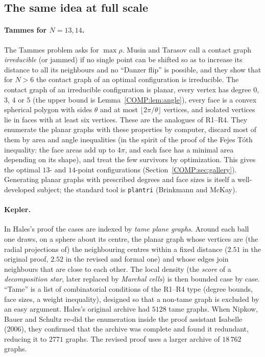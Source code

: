\documentclass[11pt,openany]{book}
\theoremstyle{plain}
\theoremstyle{definition}
\theoremstyle{remark}
\begin{document}
\subsection{The same idea at full scale}
\paragraph{Tammes for $N=13,14$.} The Tammes problem asks for $\max\rho$. Musin and Tarasov call a
contact graph \emph{irreducible} (or jammed) if no single point can be shifted so as to increase its
distance to all its neighbours and no ``Danzer flip'' is possible, and they show that for $N>6$ the
contact graph of an optimal configuration is irreducible. The
contact graph of an irreducible configuration is planar, every vertex has degree $0$, $3$, $4$ or $5$
(the upper bound is Lemma~\ref{COMP:lem:angle}), every face is a convex spherical polygon with sides $\theta$ and at most
$\lfloor2\pi/\theta\rfloor$ vertices, and isolated vertices lie in faces with at least six vertices.
These are the analogues of R1--R4. They enumerate the planar graphs with these properties by computer,
discard most of them by area and angle inequalities (in the spirit of the proof of the Fejes T\'oth
inequality: the face areas add up to $4\pi$, and each face has a minimal area depending on its
shape), and treat the few survivors by optimization. This gives the optimal $13$- and $14$-point
configurations (Section~\ref{COMP:sec:gallery}). Generating planar graphs with prescribed degrees and face
sizes is itself a well-developed subject; the standard tool is \texttt{plantri} (Brinkmann and McKay).

\paragraph{Kepler.} In Hales's proof the cases are indexed by \emph{tame plane graphs}. Around each ball
one draws, on a sphere about its centre, the planar graph whose vertices are (the radial projections of)
the neighbouring centres within a fixed distance ($2.51$ in the original proof, $2.52$ in the revised and formal
one) and whose edges join neighbours that are close to each other. The local density (the \emph{score} of a
\emph{decomposition star}, later replaced by \emph{Marchal cells}) is then bounded case by case.
``Tame'' is a list of combinatorial conditions of the R1--R4 type (degree bounds, face sizes, a weight
inequality), designed so that a non-tame graph is excluded by an easy argument. Hales's original archive
had $5128$ tame graphs. When Nipkow, Bauer and Schultz re-did the enumeration inside the proof assistant
Isabelle (2006), they confirmed that the archive was complete and found it redundant, reducing it to
$2771$ graphs. The revised proof uses a larger archive of $18\,762$ graphs.
\end{document}
